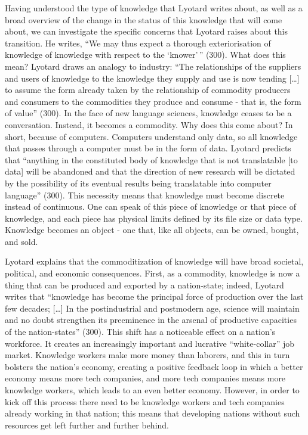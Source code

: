 \documentclass[titlepage]{article}
\begin{document}
Having understood the type of knowledge that Lyotard writes about, as
well as a broad overview of the change in the status of this knowledge
that will come about, we can investigate the specific concerns that
Lyotard raises about this transition. He writes, ``We may thus expect a
thorough exteriorisation of knowledge of knowledge with respect to the
`knower'\,'' (300). What does this mean? Lyotard draws an analogy to
industry: ``The relationships of the suppliers and users of knowledge to
the knowledge they supply and use is now tending {[}\ldots{}{]} to
assume the form already taken by the relationship of commodity producers
and consumers to the commodities they produce and consume - that is, the
form of value'' (300). In the face of new language sciences, knowledge
ceases to be a conversation. Instead, it becomes a commodity. Why does
this come about? In short, because of computers. Computers understand
only data, so all knowledge that passes through a computer must be in
the form of data. Lyotard predicts that ``anything in the constituted
body of knowledge that is not translatable {[}to data{]} will be
abandoned and that the direction of new research will be dictated by the
possibility of its eventual results being translatable into computer
language'' (300). This necessity means that knowledge must become
discrete instead of continuous. One can speak of this piece of knowledge
or that piece of knowledge, and each piece has physical limits defined
by its file size or data type. Knowledge becomes an object - one that,
like all objects, can be owned, bought, and sold.

Lyotard explains that the commoditization of knowledge will have broad
societal, political, and economic consequences. First, as a commodity,
knowledge is now a thing that can be produced and exported by a
nation-state; indeed, Lyotard writes that ``knowledge has become the
principal force of production over the last few decades; {[}\ldots{}{]}
In the postindustrial and postmodern age, science will maintain and no
doubt strengthen its preeminence in the arsenal of productive capacities
of the nation-states'' (300). This shift has a noticeable effect on a
nation's workforce. It creates an increasingly important and lucrative
``white-collar'' job market. Knowledge workers make more money than
laborers, and this in turn bolsters the nation's economy, creating a
positive feedback loop in which a better economy means more tech
companies, and more tech companies means more knowledge workers, which
leads to an even better economy. However, in order to kick off this
process there need to be knowledge workers and tech companies already
working in that nation; this means that developing nations without such
resources get left further and further behind.
\end{document}
